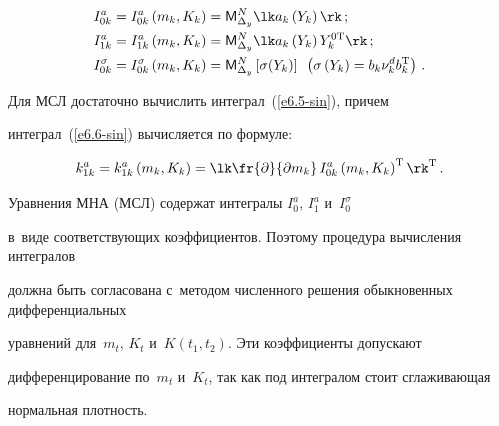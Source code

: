     \begin{align}

    I_{0k}^a &= I_{0k}^a \left(m_k, K_k\right) = 

    {\sf M}_{\Delta_y}^N \lk a_k \left(Y_k\right)\rk\,;

    \label{e6.5-sin}\\

    I_{1k}^a &= I_{1k}^a \left(m_k, K_k\right) = {\sf M}_{\Delta_y}^N \lk a_k 

    \left(Y_k\right) Y_k^{0\mathrm{T}}\rk\,;

    \label{e6.6-sin}\\

    I_{0k}^\sigma &= I_{0k}^\sigma \left(m_k, K_k\right) =

     {\sf M}_{\Delta_y}^N \left[\sigma (Y_k)\right]\enskip 

     \left(\sigma \left(Y_k\right) = b_k \nu_k^d b_k^{\mathrm{T}}\right)\,.\notag


     \end{align}



Для МСЛ достаточно вычислить интеграл~(\ref{e6.5-sin}), причем 

интеграл~(\ref{e6.6-sin}) вы\-чис\-ляется по формуле:

    \begin{equation*}

    k_{1k}^a = k_{1k}^a \left(m_k, K_k\right) =\lk \fr{\partial}{\partial m_k} \,

    I_{0k}^a \left(m_k, K_k\right)^{\mathrm{T}}\rk^{\mathrm{T}}\,.


    \end{equation*}



Уравнения МНА (МСЛ) содержат интегралы $I_0^a$, $I_1^a$ и~$I_0^\sigma$ 

в~виде соответствующих коэффициентов. Поэтому процедура вычисления интегралов 

должна быть согласована с~методом численного решения обыкновенных дифференциальных 

уравнений для~$m_t$, $K_t$ и~$K(t_1, t_2)$. Эти коэффициенты допускают 

дифференцирование по~$m_t$ и~$K_t$, так как под интегралом стоит сглаживающая 

нормальная плот\-ность.





